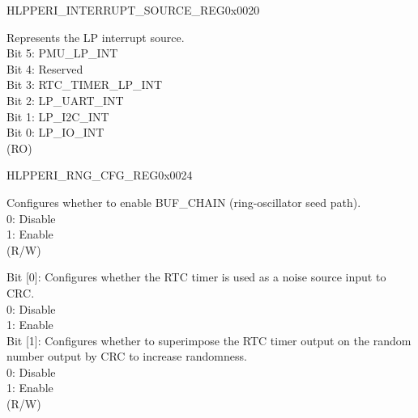 \begin{register}{H}{LPPERI\_INTERRUPT\_SOURCE\_REG}{0x0020}\label{regdesc:LPPERIINTERRUPTSOURCEREG}
%
%
\regnewline%
\begin{regdesc}\begin{reglist}
\label{fielddesc:LPPERILPINTERRUPTSOURCE}\item [LPPERI\_LP\_INTERRUPT\_SOURCE] Represents the LP interrupt source.\\
Bit 5: PMU\_LP\_INT\\
Bit 4: Reserved\\
Bit 3: RTC\_TIMER\_LP\_INT\\
Bit 2: LP\_UART\_INT\\
Bit 1: LP\_I2C\_INT\\
Bit 0: LP\_IO\_INT\\
(RO)
\end{reglist}\end{regdesc}
\end{register}


\begin{register}{H}{LPPERI\_RNG\_CFG\_REG}{0x0024}\label{regdesc:LPPERIRNGCFGREG}
%
%
%
%
\regnewline%
\begin{regdesc}\begin{reglist}
\label{fielddesc:LPPERIRNGSAMPLEENABLE}\item [LPPERI\_RNG\_SAMPLE\_ENABLE] Configures whether to enable BUF\_CHAIN (ring-oscillator seed path).\\
0: Disable\\
1: Enable\\
(R/W)
\label{fielddesc:LPPERIRTCTIMEREN}\item [LPPERI\_RTC\_TIMER\_EN] Bit [0]: Configures whether the RTC timer is used as a noise source input to CRC.\\
0: Disable\\
1: Enable\\
Bit [1]: Configures whether to superimpose the RTC timer output on the random number output by CRC to increase randomness.\\
0: Disable\\
1: Enable\\
(R/W)
\end{reglist}\end{regdesc}
\end{register}


